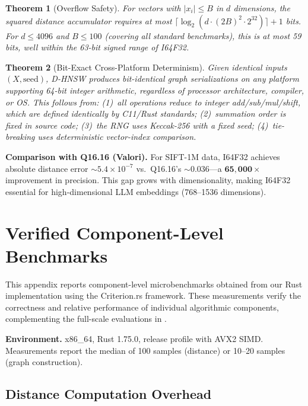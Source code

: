 \documentclass[10pt,journal]{IEEEtran}
\newtheorem{theorem}{Theorem}
\newcommand{\dhnsw}{\textsc{D-HNSW}}
\begin{document}
\begin{theorem}[Overflow Safety]
\label{thm:overflow}
For vectors with $|x_i| \leq B$ in $d$ dimensions, the squared distance accumulator requires at most $\lceil\log_2(d \cdot (2B)^2 \cdot 2^{32})\rceil + 1$ bits. For $d \leq 4096$ and $B \leq 100$ (covering all standard benchmarks), this is at most 59 bits, well within the 63-bit signed range of I64F32.
\end{theorem}

\begin{theorem}[Bit-Exact Cross-Platform Determinism]
\label{thm:crossplatform}
Given identical inputs $(X, \text{seed})$, \dhnsw{} produces bit-identical graph serializations on any platform supporting 64-bit integer arithmetic, regardless of processor architecture, compiler, or OS. This follows from: (1)~all operations reduce to integer add/sub/mul/shift, which are defined identically by C11/Rust standards; (2)~summation order is fixed in source code; (3)~the RNG uses Keccak-256 with a fixed seed; (4)~tie-breaking uses deterministic vector-index comparison.
\end{theorem}

\textbf{Comparison with Q16.16 (Valori).} For SIFT-1M data, I64F32 achieves absolute distance error $\sim 5.4 \times 10^{-7}$ vs.\ Q16.16's $\sim 0.036$---a $\mathbf{65{,}000\times}$ improvement in precision. This gap grows with dimensionality, making I64F32 essential for high-dimensional LLM embeddings (768--1536 dimensions).


\section{Verified Component-Level Benchmarks}
\label{sec:appendix_benchmarks}

This appendix reports component-level microbenchmarks obtained from our Rust implementation using the Criterion.rs framework. These measurements verify the correctness and relative performance of individual algorithmic components, complementing the full-scale evaluations in .

\textbf{Environment.} x86\_64, Rust 1.75.0, release profile with AVX2 SIMD. Measurements report the median of 100 samples (distance) or 10--20 samples (graph construction).

\subsection{Distance Computation Overhead}
\end{document}

